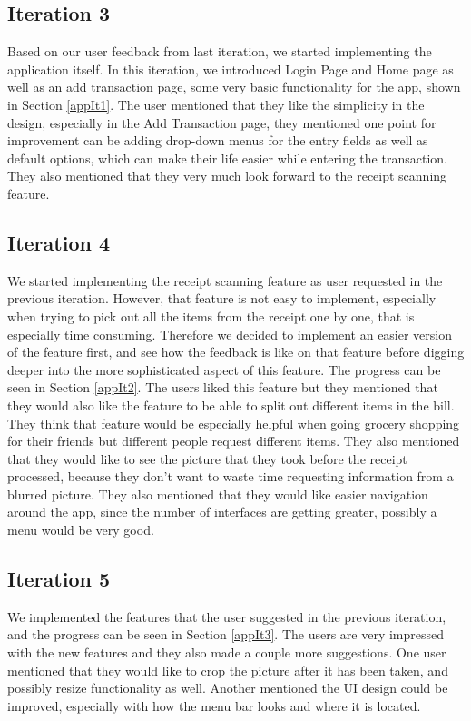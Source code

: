 \documentclass[a4wide, 11pt]{article}
\begin{document}
\subsection{Iteration 3}
Based on our user feedback from last iteration, we started implementing the application itself.
In this iteration, we introduced Login Page and Home page as well as an add transaction page, some very basic functionality for the app, shown in Section \ref{appIt1}. The user mentioned that they like the simplicity in the design, especially in the Add Transaction page, they mentioned one point for improvement can be adding drop-down menus for the entry fields as well as default options, which can make their life easier while entering the transaction. They also mentioned that they very much look forward to the receipt scanning feature.

\subsection{Iteration 4}
We started implementing the receipt scanning feature as user requested in the previous iteration. However, that feature is not easy to implement, especially when trying to pick out all the items from the receipt one by one, that is especially time consuming. Therefore we decided to implement an easier version of the feature first, and see how the feedback is like on that feature before digging deeper into the more sophisticated aspect of this feature. The progress can be seen in Section \ref{appIt2}. The users liked this feature but they mentioned that they would also like the feature to be able to split out different items in the bill. They think that feature would be especially helpful when going grocery shopping for their friends but different people request different items. They also mentioned that they would like to see the picture that they took before the receipt processed, because they don't want to waste time requesting information from a blurred picture. They also mentioned that they would like easier navigation around the app, since the number of interfaces are getting greater, possibly a menu would be very good.

\subsection{Iteration 5}
We implemented the features that the user suggested in the previous iteration, and the progress can be seen in Section \ref{appIt3}. The users are very impressed with the new features and they also made a couple more suggestions. One user mentioned that they would like to crop the picture after it has been taken, and possibly resize functionality as well. Another mentioned the UI design could be improved, especially with how the menu bar looks and where it is located.
\end{document}
